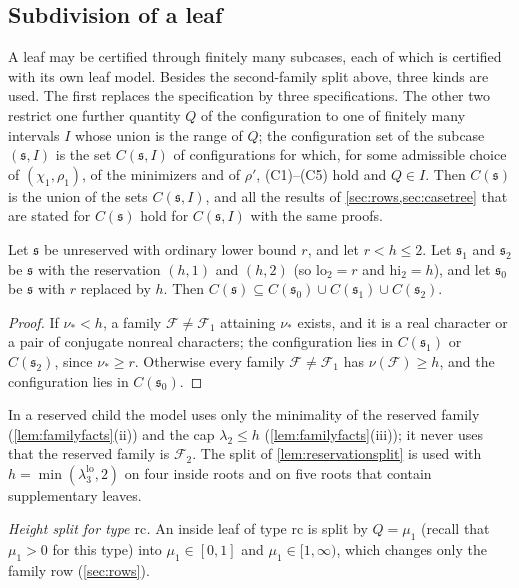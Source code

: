 \documentclass[11pt]{amsart}
\numberwithin{equation}{section}
\theoremstyle{plain}
\theoremstyle{definition}
\theoremstyle{remark}
\newcommand{\lo}{\mathrm{lo}}
\newcommand{\hi}{\mathrm{hi}}
\newcommand{\1}{\mathbf{1}}
\begin{document}
\subsection{Subdivision of a leaf}\label{subsec:subdivision}
A leaf may be certified through finitely many subcases, each of which is certified with its own
leaf model. Besides the second-family split above, three kinds are used. The first replaces the
specification by three specifications. The other two restrict one further quantity $Q$ of the
configuration to one of finitely many intervals $I$ whose union is the range of $Q$; the
configuration set of the subcase $(\mathfrak s,I)$ is the set $C(\mathfrak s,I)$ of configurations for which, for
some admissible choice of $(\chi_1,\rho_1)$, of the minimizers and of $\rho'$, (C1)--(C5) hold and
$Q\in I$. Then $C(\mathfrak s)$ is the union of the sets $C(\mathfrak s,I)$, and all the results of
\cref{sec:rows,sec:casetree} that are stated for $C(\mathfrak s)$ hold for $C(\mathfrak s,I)$ with the same proofs.

\begin{lemma}\label{lem:reservationsplit}
Let $\mathfrak s$ be unreserved with ordinary lower bound $r$, and let $r<h\le2$. Let $\mathfrak s_1$ and
$\mathfrak s_2$ be $\mathfrak s$ with the reservation $(h,1)$ and $(h,2)$ (so $\lo_2=r$ and $\hi_2=h$), and let $\mathfrak s_0$ be $\mathfrak s$ with
$r$ replaced by $h$. Then $C(\mathfrak s)\subseteq C(\mathfrak s_0)\cup C(\mathfrak s_1)\cup C(\mathfrak s_2)$.
\end{lemma}

\begin{proof}
If $\nu_*<h$, a family $\mathcal F\ne\mathcal F_1$ attaining $\nu_*$ exists, and it is a real character or a pair of
conjugate nonreal characters; the configuration lies in $C(\mathfrak s_1)$ or $C(\mathfrak s_2)$, since
$\nu_*\ge r$. Otherwise every family $\mathcal F\ne\mathcal F_1$ has $\nu(\mathcal F)\ge h$, and the configuration lies in
$C(\mathfrak s_0)$.
\end{proof}

In a reserved child the model uses only the minimality of the reserved family
(\cref{lem:familyfacts}(ii)) and the cap $\lambda_2\le h$ (\cref{lem:familyfacts}(iii)); it never uses
that the reserved family is $\mathcal F_2$. The split of \cref{lem:reservationsplit} is used with $h=\min(\lambda_3^{\lo},2)$ on four inside
roots and on five roots that contain supplementary leaves.

\emph{Height split for type $\mathrm{rc}$.} An inside leaf of type $\mathrm{rc}$ is split by $Q=\mu_1$
(recall that $\mu_1>0$ for this type) into $\mu_1\in[0,1]$ and $\mu_1\in[1,\infty)$, which changes only the
family row (\cref{sec:rows}).
\end{document}
